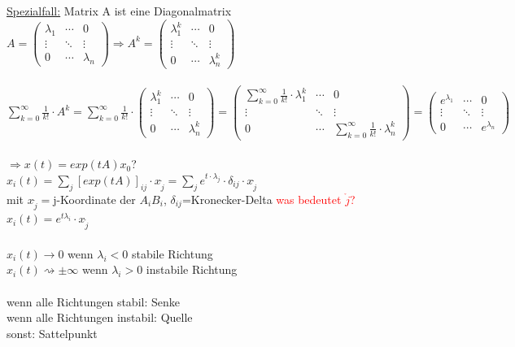 \underline{Spezialfall:} Matrix A ist eine Diagonalmatrix\\

$A = 
\begin{pmatrix}
 \lambda_1 & \cdots & 0 \\
 \vdots  & \ddots & \vdots  \\
 0 & \cdots & \lambda_n
\end{pmatrix}
\Rightarrow
A^k = 
\begin{pmatrix}
 \lambda_1^k & \cdots & 0 \\
 \vdots  & \ddots & \vdots  \\
 0 & \cdots & \lambda_n^k
\end{pmatrix}$
\\\\

$\displaystyle \sum_{k=0}^{\infty} \frac{1}{k!} \cdot A^k=\displaystyle  \sum_{k=0}^{\infty} \frac{1}{k!} \cdot  
\begin{pmatrix}
 \lambda_1^k & \cdots & 0 \\
 \vdots  & \ddots & \vdots  \\
 0 & \cdots & \lambda_n^k
\end{pmatrix} = 
\begin{pmatrix}
 \sum_{k=0}^{\infty} \frac{1}{k!} \cdot \lambda_1^k & \cdots & 0 \\
 \vdots  & \ddots & \vdots  \\
 0 & \cdots & \sum_{k=0}^{\infty} \frac{1}{k!} \cdot \lambda_n^k
\end{pmatrix} = 
\begin{pmatrix}
 e^{\lambda_1} & \cdots & 0 \\
 \vdots  & \ddots & \vdots  \\
 0 & \cdots & e^{\lambda_n}
\end{pmatrix}
$
\\\\

$\Rightarrow x(t)=exp(tA)x_0$?\\
$x_i(t)=\sum_{j} [exp(tA)]_{ij} \cdot x_{\mathring{j}} = \sum_{j} e^{t \cdot \lambda_j} \cdot \delta_{ij} \cdot x_{\mathring{j}}$\\
mit $x_{\mathring{j}}=$j-Koordinate der $A_iB_i$, $\delta_{ij}$=Kronecker-Delta \textcolor{red}{was bedeutet $\mathring{j}$?}\\

$x_i(t)=e^{t \lambda_i} \cdot x_{\mathring{j}}$
\\\\
$x_i(t) \rightarrow 0$ wenn $\lambda_i < 0$ stabile Richtung\\
$x_i(t) \rightsquigarrow \pm \infty$ wenn $\lambda_i > 0$ instabile Richtung\\\\
wenn alle Richtungen stabil: Senke\\
wenn alle Richtungen instabil: Quelle\\
sonst: Sattelpunkt\\

